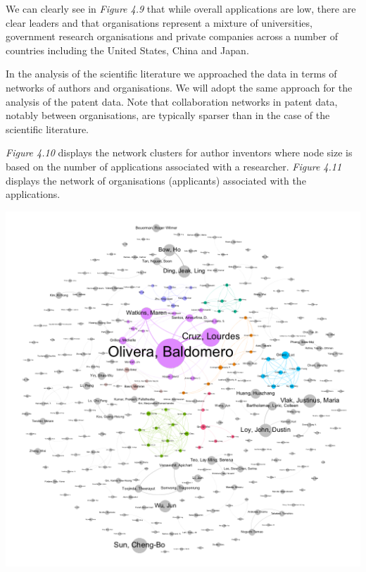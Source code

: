 \documentclass[]{book}
\theoremstyle{definition}
\theoremstyle{definition}
\theoremstyle{definition}
\theoremstyle{remark}
\begin{document}
We can clearly see in \emph{Figure 4.9} that while overall applications
are low, there are clear leaders and that organisations represent a
mixture of universities, government research organisations and private
companies across a number of countries including the United States,
China and Japan.

In the analysis of the scientific literature we approached the data in
terms of networks of authors and organisations. We will adopt the same
approach for the analysis of the patent data. Note that collaboration
networks in patent data, notably between organisations, are typically
sparser than in the case of the scientific literature.

\emph{Figure 4.10} displays the network clusters for author inventors
where node size is based on the number of applications associated with a
researcher. \emph{Figure 4.11} displays the network of organisations
(applicants) associated with the applications.

\includegraphics[width=14.22in]{images-patents/author_inventor_network}
\end{document}
